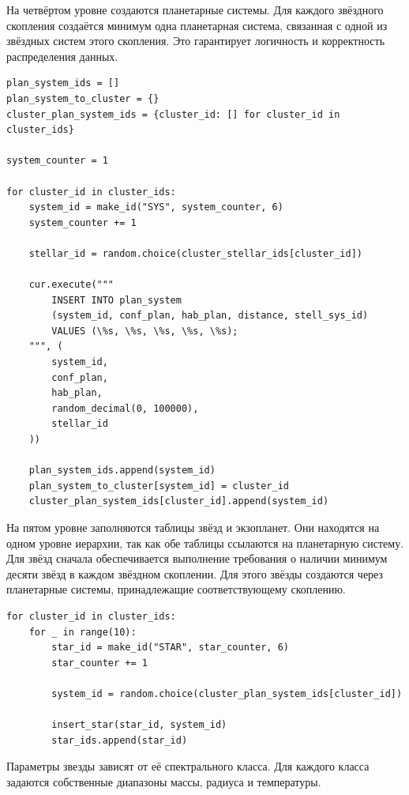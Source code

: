 \documentclass[14pt,a4paper]{extarticle}
\begin{document}
На четвёртом уровне создаются планетарные системы. Для каждого звёздного скопления создаётся минимум одна планетарная система, связанная с одной из звёздных систем этого скопления. Это гарантирует логичность и корректность распределения данных. %

\begin{lstlisting}[caption={Вставка планетарных систем}]
plan_system_ids = []
plan_system_to_cluster = {}
cluster_plan_system_ids = {cluster_id: [] for cluster_id in cluster_ids}

system_counter = 1

for cluster_id in cluster_ids:
    system_id = make_id("SYS", system_counter, 6)
    system_counter += 1

    stellar_id = random.choice(cluster_stellar_ids[cluster_id])

    cur.execute("""
        INSERT INTO plan_system
        (system_id, conf_plan, hab_plan, distance, stell_sys_id)
        VALUES (\%s, \%s, \%s, \%s, \%s);
    """, (
        system_id,
        conf_plan,
        hab_plan,
        random_decimal(0, 100000),
        stellar_id
    ))

    plan_system_ids.append(system_id)
    plan_system_to_cluster[system_id] = cluster_id
    cluster_plan_system_ids[cluster_id].append(system_id)
\end{lstlisting}

На пятом уровне заполняются таблицы звёзд и экзопланет. Они находятся на одном уровне иерархии, так как обе таблицы ссылаются на планетарную систему. Для звёзд сначала обеспечивается выполнение требования о наличии минимум десяти звёзд в каждом звёздном скоплении. Для этого звёзды создаются через планетарные системы, принадлежащие соответствующему скоплению.

\begin{lstlisting}[caption={Создание минимум десяти звёзд на скопление}]
for cluster_id in cluster_ids:
    for _ in range(10):
        star_id = make_id("STAR", star_counter, 6)
        star_counter += 1

        system_id = random.choice(cluster_plan_system_ids[cluster_id])

        insert_star(star_id, system_id)
        star_ids.append(star_id)
\end{lstlisting}

Параметры звезды зависят от её спектрального класса. Для каждого класса задаются собственные диапазоны массы, радиуса и температуры. %
\end{document}

